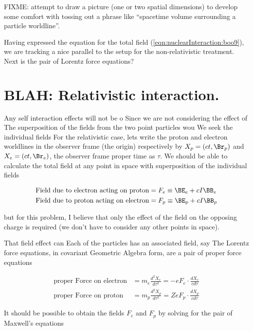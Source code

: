 FIXME: attempt to draw a picture (one or two spatial dimensions) to develop some comfort with tossing out a phrase like ``spacetime volume surrounding a particle worldline''.

Having expressed the equation for the total field (\ref{eqn:nuclearInteraction:boo9}), we are tracking a nice parallel to the setup for the non-relativistic treatment.  Next is the pair of Lorentz force equations?

\section{BLAH: Relativistic interaction.}

Any self interaction effects will not be o
Since we are not considering the effect of 
The superposition of the fields from the two point particles wou
We seek the individual fields 
For the relativistic case, lets write the proton and electron worldlines in the observer frame (the origin) respectively by $X_p = (ct, \Br_p)$ and $X_e = (ct,\Br_e)$, the observer frame proper time as $\tau$.  We should be able to calculate the total field at any point in space with superposition of the individual fields

\begin{align}\label{eqn:nuclearInteraction:hoo3}
\text{Field due to electron acting on proton} &= F_e \equiv \BE_e + c I\BB_e \\
\text{Field due to proton acting on electron} &= F_p \equiv \BE_p + c I\BB_p
\end{align}

but for this problem, I believe that only the effect of the field on the opposing charge is required (we don't have to consider any other points in space).

That field effect 
can Each of the particles has an associated field, say
The Lorentz force equations, in covariant Geometric Algebra form, are a pair of proper force equations

\begin{align}\label{eqn:nuclearInteraction:hoo6}
\text{proper Force on electron} &= m_e \frac{d^2 X_e}{d\tau^2} = - e F_e \cdot \frac{d X_e}{c d\tau} \\
\text{proper Force on proton} &= m_p \frac{d^2 X_p}{d\tau^2} = Z e F_p \cdot \frac{d X_p}{c d\tau}
\end{align}


It should be possible to obtain the fields $F_e$ and $F_p$ by solving for the pair of Maxwell's equations


